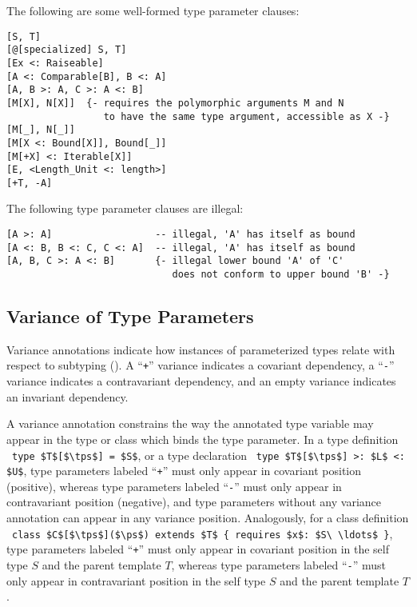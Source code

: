 \example The following are some well-formed type parameter clauses:
\begin{lstlisting}
[S, T]
[@[specialized] S, T]
[Ex <: Raiseable]
[A <: Comparable[B], B <: A]
[A, B >: A, C >: A <: B]
[M[X], N[X]]  {- requires the polymorphic arguments M and N 
                 to have the same type argument, accessible as X -}
[M[_], N[_]]
[M[X <: Bound[X]], Bound[_]]
[M[+X] <: Iterable[X]]
[E, <Length_Unit <: length>]
[+T, -A]
\end{lstlisting}
The following type parameter clauses are illegal:
\begin{lstlisting}
[A >: A]                  -- illegal, 'A' has itself as bound
[A <: B, B <: C, C <: A]  -- illegal, 'A' has itself as bound
[A, B, C >: A <: B]       {- illegal lower bound 'A' of 'C'
                             does not conform to upper bound 'B' -}
\end{lstlisting}





\subsection{Variance of Type Parameters}
\label{sec:variance-of-type-parameters}


Variance annotations indicate how instances of parameterized types relate with respect to subtyping (). A ``\lstinline!+!'' variance indicates a covariant dependency, a ``\lstinline!-!'' variance indicates a contravariant dependency, and an empty variance indicates an invariant dependency. 

A variance annotation constrains the way the annotated type variable may appear in the type or class which binds the type parameter. In a type definition ~\lstinline!type $T$[$\tps$] = $S$!, or a type declaration ~\lstinline!type $T$[$\tps$] >: $L$ <: $U$!, type parameters labeled ``\lstinline!+!'' must only appear in covariant position (positive), whereas type parameters labeled ``\lstinline!-!'' must only appear in contravariant position (negative), and type parameters without any variance annotation can appear in any variance position. Analogously, for a class definition ~\lstinline!class $C$[$\tps$]($\ps$) extends $T$ { requires $x$: $S\ \ldots$ }!, type parameters labeled ``\lstinline!+!'' must only appear in covariant position in the self type $S$ and the parent template $T$, whereas type parameters labeled ``\lstinline!-!'' must only appear in contravariant position in the self type $S$ and the parent template $T$.

